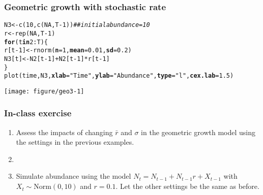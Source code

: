 \documentclass[color=usenames,dvipsnames]{beamer}\usepackage[]{graphicx}\usepackage[]{color}
\makeatletter
\newcommand{\hlnum}[1]{\textcolor[rgb]{0.69,0.494,0}{#1}}%
\newcommand{\hlstr}[1]{\textcolor[rgb]{0.749,0.012,0.012}{#1}}%
\newcommand{\hlcom}[1]{\textcolor[rgb]{0.514,0.506,0.514}{\textit{#1}}}%
\newcommand{\hlopt}[1]{\textcolor[rgb]{0,0,0}{#1}}%
\newcommand{\hlstd}[1]{\textcolor[rgb]{0,0,0}{#1}}%
\newcommand{\hlkwa}[1]{\textcolor[rgb]{0,0,0}{\textbf{#1}}}%
\newcommand{\hlkwb}[1]{\textcolor[rgb]{0,0.341,0.682}{#1}}%
\newcommand{\hlkwc}[1]{\textcolor[rgb]{0,0,0}{\textbf{#1}}}%
\newcommand{\hlkwd}[1]{\textcolor[rgb]{0.004,0.004,0.506}{#1}}%
\newenvironment{kframe}{%
 \def\at@end@of@kframe{}%
 \ifinner\ifhmode%
  \def\at@end@of@kframe{\end{minipage}}%
  \begin{minipage}{\columnwidth}%
 \fi\fi%
 \def\FrameCommand##1{\hskip\@totalleftmargin \hskip-\fboxsep
 \colorbox{shadecolor}{##1}\hskip-\fboxsep
     \hskip-\linewidth \hskip-\@totalleftmargin \hskip\columnwidth}%
 \MakeFramed {\advance\hsize-\width
   \@totalleftmargin\z@ \linewidth\hsize
   \@setminipage}}%
 {\par\unskip\endMakeFramed%
 \at@end@of@kframe}
\newenvironment{knitrout}{}{} %
\makeatother
\begin{document}
\begin{frame}[fragile]
  \frametitle{Geometric growth with stochastic rate}
\begin{knitrout}\tiny
{}\color{fgcolor}\begin{kframe}
\begin{alltt}
\hlstd{N3} \hlkwb{<-} \hlkwd{c}\hlstd{(}\hlnum{10}\hlstd{,} \hlkwd{c}\hlstd{(}\hlnum{NA}\hlstd{, T}\hlopt{-}\hlnum{1}\hlstd{))}  \hlcom{## initial abundance = 10}
\hlstd{r} \hlkwb{<-} \hlkwd{rep}\hlstd{(}\hlnum{NA}\hlstd{, T}\hlopt{-}\hlnum{1}\hlstd{)}
\hlkwa{for}\hlstd{(t} \hlkwa{in} \hlnum{2}\hlopt{:}\hlstd{T) \{}
    \hlstd{r[t}\hlopt{-}\hlnum{1}\hlstd{]} \hlkwb{<-} \hlkwd{rnorm}\hlstd{(}\hlkwc{n}\hlstd{=}\hlnum{1}\hlstd{,} \hlkwc{mean}\hlstd{=}\hlnum{0.01}\hlstd{,} \hlkwc{sd}\hlstd{=}\hlnum{0.2}\hlstd{)}
    \hlstd{N3[t]} \hlkwb{<-} \hlstd{N2[t}\hlopt{-}\hlnum{1}\hlstd{]} \hlopt{+} \hlstd{N2[t}\hlopt{-}\hlnum{1}\hlstd{]}\hlopt{*}\hlstd{r[t}\hlopt{-}\hlnum{1}\hlstd{]}
\hlstd{\}}
\hlkwd{plot}\hlstd{(time, N3,} \hlkwc{xlab}\hlstd{=}\hlstr{"Time"}\hlstd{,} \hlkwc{ylab}\hlstd{=}\hlstr{"Abundance"}\hlstd{,} \hlkwc{type}\hlstd{=}\hlstr{"l"}\hlstd{,} \hlkwc{cex.lab}\hlstd{=}\hlnum{1.5}\hlstd{)}
\end{alltt}
\end{kframe}

{\centering \texttt{[image: figure/geo3-1]} 

}



\end{knitrout}
\end{frame}



\begin{frame}
  \frametitle{In-class exercise}
  \centering
  \begin{enumerate}
    \item<1-> Assess the impacts of changing $\bar{r}$ and $\sigma$ in the
      geometric growth model using the settings in the previous examples.
    \item[]
    \item<2-> Simulate abundance using the model $N_t = N_{t-1} +
      N_{t-1}r + X_{t-1}$ with $X_t \sim \mathrm{Norm}(0, 10)$ and
      $r=0.1$. Let the other settings be the same as before.
\end{enumerate}
\end{frame}
\end{document}

